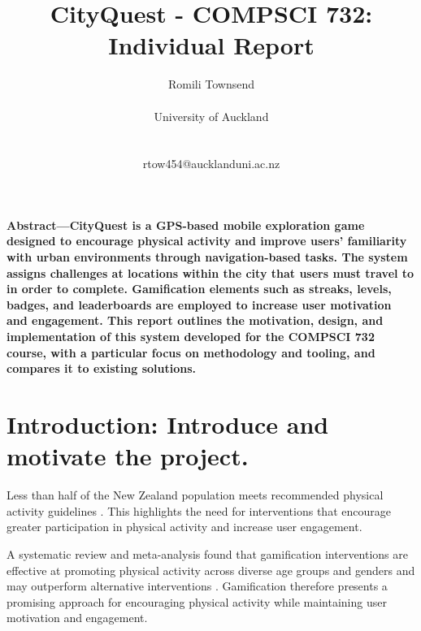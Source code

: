 \documentclass{vgtc}                          %
\title{CityQuest - COMPSCI 732: Individual Report}
\author{Romili Townsend \\ 
    \parbox{1.4in}{\scriptsize \centering University of Auckland}\\
    \parbox{1.4in}{\scriptsize \centering rtow454@aucklanduni.ac.nz}
}
\begin{document}
\maketitle

\firstsection{}
\textbf{Abstract---CityQuest is a GPS-based mobile exploration game designed to encourage physical activity and improve users' familiarity with urban environments through navigation-based tasks.
The system assigns challenges at locations within the city that users must travel to in order to complete. Gamification elements such as streaks, levels, badges, and leaderboards are employed to increase user motivation and engagement.
This report outlines the motivation, design, and implementation of this system developed for the COMPSCI 732 course, with a particular focus on methodology and tooling, and compares it to existing solutions.}


\section{Introduction: Introduce and motivate the project.} 

Less than half of the New Zealand population meets recommended physical activity guidelines \cite{PhysicalActivityProfilesandPerceivedEnvironmentalDeterminantsinNewZealandANationalCrossSectionalStudy}. This highlights the need for interventions that encourage greater participation in physical activity and increase user engagement.

A systematic review and meta-analysis found that gamification interventions are effective at promoting physical activity across diverse age groups and genders and may outperform alternative interventions \cite{mazeas2022gamification}. Gamification therefore presents a promising approach for encouraging physical activity while maintaining user motivation and engagement.
\end{document}
